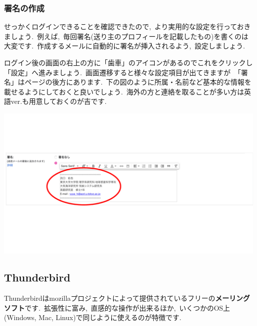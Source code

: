 \documentclass{jarticle}
\begin{document}
\subsubsection{署名の作成}
せっかくログインできることを確認できたので,\ より実用的な設定を行っておきましょう.\ 
例えば,\ 毎回署名(送り主のプロフィールを記載したもの)を書くのは大変です.\ 
作成するメールに自動的に署名が挿入されるよう,\ 設定しましょう.\ 

ログイン後の画面の右上の方に「歯車」のアイコンがあるのでこれをクリックし「設定」へ進みましょう.\ 
画面遷移すると様々な設定項目が出てきますが\ 「署名」はページの後方にあります.\ 下の図のように所属・名前など基本的な情報を載せるようにしておくと良いでしょう.\ 海外の方と連絡を取ることが多い方は英語ver.も用意しておくのが吉です.\ 

\begin{center}
  \includegraphics[width=140mm,pagebox=cropbox,clip]{fig/shomei.pdf}
\end{center}

\subsection{Thunderbird}
  Thunderbirdはmozillaプロジェクトによって提供されているフリーの{\bf メーリング
  ソフト}です.\ 拡張性に富み,\ 直感的な操作が出来るほか,\ いくつかのOS上
  (Windows, Mac, Linux)で同じように使えるのが特徴です.\ 
  
\end{document}
